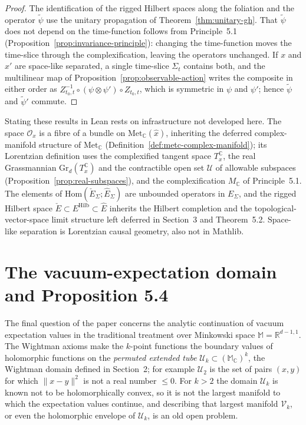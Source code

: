 \begin{proof}
  \leanok
  The identification of the rigged Hilbert spaces along the foliation and the operator
  $\tilde\psi$ use the unitary propagation of Theorem~\ref{thm:unitary-gh}. That
  $\tilde\psi$ does not depend on the time-function follows from Principle~5.1
  (Proposition~\ref{prop:invariance-principle}): changing the time-function moves the
  time-slice through the complexification, leaving the operators unchanged. If $x$ and
  $x'$ are space-like separated, a single time-slice $\Sigma_t$ contains both, and the
  multilinear map of Proposition~\ref{prop:observable-action} writes the composite in
  either order as $Z_{t_0,t}^{-1} \circ (\psi \otimes \psi') \circ Z_{t_0,t}$, which is
  symmetric in $\psi$ and $\psi'$; hence $\tilde\psi$ and $\tilde\psi'$ commute.
\end{proof}

Stating these results in Lean rests on infrastructure not developed here. The space
$\mathcal O_x$ is a fibre of a bundle on $\mathrm{Met}_{\mathbb C}(\hat x)$, inheriting
the deferred complex-manifold structure of $\mathrm{Met}_{\mathbb C}$
(Definition~\ref{def:metc-complex-manifold}); its Lorentzian definition uses the
complexified tangent space $T_x^{\mathbb C}$, the real Grassmannian
$\mathrm{Gr}_d(T_x^{\mathbb C})$ and the contractible open set $\mathcal U$ of allowable
subspaces (Proposition~\ref{prop:real-subspaces}), and the complexification
$M_{\mathbb C}$ of Principle~5.1. The elements of
$\mathrm{Hom}(\check E_{\Sigma}; \hat E_{\Sigma})$ are unbounded operators in
$E_{\Sigma}$, and the rigged Hilbert space
$\check E \subset E^{\mathrm{Hilb}} \subset \hat E$ inherits the Hilbert completion and
the topological-vector-space limit structure left deferred in Section~3 and Theorem~5.2.
Space-like separation is Lorentzian causal geometry, also not in Mathlib.

\section{The vacuum-expectation domain and Proposition 5.4}

The final question of the paper concerns the analytic continuation of vacuum
expectation values in the traditional treatment over Minkowski space
$\mathbb M = \mathbb R^{d-1,1}$. The Wightman axioms make the $k$-point functions the
boundary values of holomorphic functions on the \emph{permuted extended tube}
$\mathcal U_k \subset (\mathbb M_{\mathbb C})^k$, the Wightman domain defined in
Section~2; for example $\mathcal U_2$ is the set of pairs $(x,y)$ for which
$\|x-y\|^2$ is not a real number $\le 0$. For $k > 2$ the domain $\mathcal U_k$ is
known not to be holomorphically convex, so it is not the largest manifold to which the
expectation values continue, and describing that largest manifold $\mathcal V_k$, or
even the holomorphic envelope of $\mathcal U_k$, is an old open problem.

